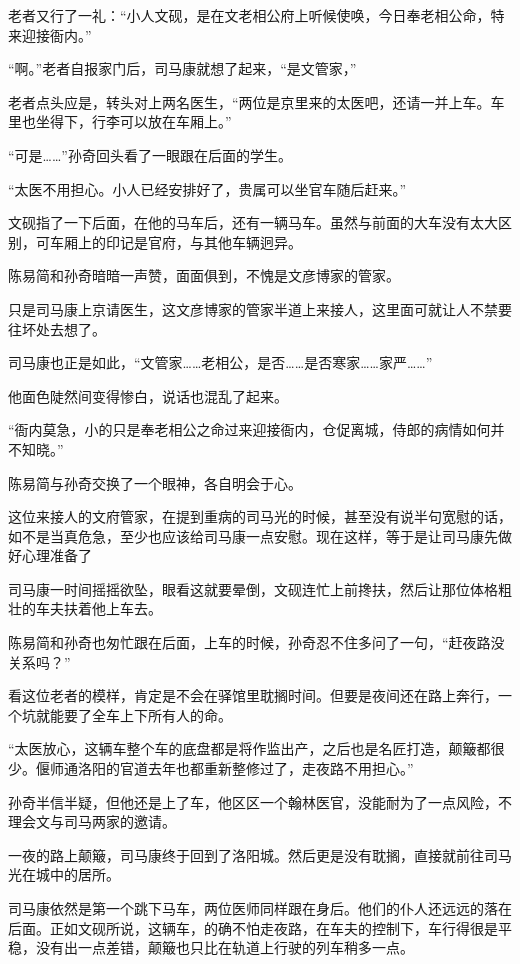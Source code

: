 老者又行了一礼：“小人文砚，是在文老相公府上听候使唤，今日奉老相公命，特来迎接衙内。”

“啊。”老者自报家门后，司马康就想了起来，“是文管家，”

老者点头应是，转头对上两名医生，“两位是京里来的太医吧，还请一并上车。车里也坐得下，行李可以放在车厢上。”

“可是……”孙奇回头看了一眼跟在后面的学生。

“太医不用担心。小人已经安排好了，贵属可以坐官车随后赶来。”

文砚指了一下后面，在他的马车后，还有一辆马车。虽然与前面的大车没有太大区别，可车厢上的印记是官府，与其他车辆迥异。

陈易简和孙奇暗暗一声赞，面面俱到，不愧是文彦博家的管家。

只是司马康上京请医生，这文彦博家的管家半道上来接人，这里面可就让人不禁要往坏处去想了。

司马康也正是如此，“文管家……老相公，是否……是否寒家……家严……”

他面色陡然间变得惨白，说话也混乱了起来。

“衙内莫急，小的只是奉老相公之命过来迎接衙内，仓促离城，侍郎的病情如何并不知晓。”

陈易简与孙奇交换了一个眼神，各自明会于心。

这位来接人的文府管家，在提到重病的司马光的时候，甚至没有说半句宽慰的话，如不是当真危急，至少也应该给司马康一点安慰。现在这样，等于是让司马康先做好心理准备了

司马康一时间摇摇欲坠，眼看这就要晕倒，文砚连忙上前搀扶，然后让那位体格粗壮的车夫扶着他上车去。

陈易简和孙奇也匆忙跟在后面，上车的时候，孙奇忍不住多问了一句，“赶夜路没关系吗？”

看这位老者的模样，肯定是不会在驿馆里耽搁时间。但要是夜间还在路上奔行，一个坑就能要了全车上下所有人的命。

“太医放心，这辆车整个车的底盘都是将作监出产，之后也是名匠打造，颠簸都很少。偃师通洛阳的官道去年也都重新整修过了，走夜路不用担心。”

孙奇半信半疑，但他还是上了车，他区区一个翰林医官，没能耐为了一点风险，不理会文与司马两家的邀请。

一夜的路上颠簸，司马康终于回到了洛阳城。然后更是没有耽搁，直接就前往司马光在城中的居所。

司马康依然是第一个跳下马车，两位医师同样跟在身后。他们的仆人还远远的落在后面。正如文砚所说，这辆车，的确不怕走夜路，在车夫的控制下，车行得很是平稳，没有出一点差错，颠簸也只比在轨道上行驶的列车稍多一点。

